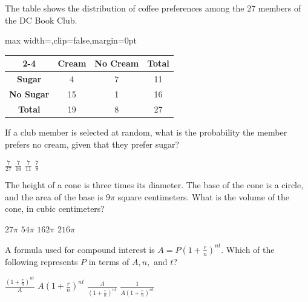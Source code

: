 \question[1]
The table shows the distribution of coffee preferences among the 27 members of the DC Book Club.
\begin{center}
  \renewcommand{\arraystretch}{1.3}
  \setlength{\tabcolsep}{0.5em}
  \label{tab:sat-drill-09-coffee}%
  \vspace{0.35em}
  \begin{adjustbox}{max width=\linewidth,clip=false,margin=0pt}
  \begin{tabular}{|c|c|c|c|}
    \cline{2-4}
    \multicolumn{1}{c|}{} &
      \cellcolor[HTML]{E0E0E0}\textbf{Cream} &
      \cellcolor[HTML]{E0E0E0}\textbf{No Cream} &
      \cellcolor[HTML]{E0E0E0}\textbf{Total} \\
    \hline
    \cellcolor[HTML]{E0E0E0}\textbf{Sugar} & 4 & 7 & 11 \\
    \hline
    \cellcolor[HTML]{E0E0E0}\textbf{No Sugar} & 15 & 1 & 16 \\
    \hline
    \cellcolor[HTML]{E0E0E0}\textbf{Total} & 19 & 8 & 27 \\
    \hline
  \end{tabular}
  \end{adjustbox}
\end{center}
If a club member is selected at random, what is the probability the member prefers no cream, given that they prefer sugar?
\begin{choices}
  \choice $\frac{7}{27}$
  \choice $\frac{7}{16}$
  \CorrectChoice $\frac{7}{11}$
  \choice $\frac{7}{8}$
\end{choices}




\newpage



\question[1]
The height of a cone is three times its diameter. The base of the cone is a circle, and the area of the base is $9\pi$ square centimeters. What is the volume of the cone, in cubic centimeters?
\begin{choices}
  \choice $27\pi$
  \CorrectChoice $54\pi$
  \choice $162\pi$
  \choice $216\pi$
\end{choices}

\question[1]
A formula used for compound interest is $A = P\left(1 + \frac{r}{n}\right)^{nt}$. Which of the following represents $P$ in terms of $A, n,$ and $t$?
\begin{choices}
  \choice $\frac{\left(1 + \frac{r}{n}\right)^{nt}}{A}$
  \choice $A\left(1 + \frac{r}{n}\right)^{nt}$
  \CorrectChoice $\frac{A}{\left(1 + \frac{r}{n}\right)^{nt}}$
  \choice $\frac{1}{A\left(1 + \frac{r}{n}\right)^{nt}}$
\end{choices}

